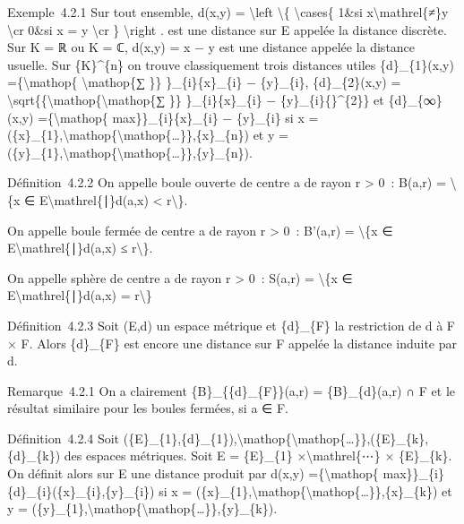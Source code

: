 \documentclass[]{article}
\begin{document}
Exemple~4.2.1 Sur tout ensemble, d(x,y) = \textbackslash{}left
\textbackslash{}\{ \textbackslash{}cases\{ 1\&si
x\textbackslash{}mathrel\{≠\}y \textbackslash{}cr 0\&si x = y
\textbackslash{}cr \} \textbackslash{}right . est une distance sur E
appelée la distance discrète. Sur K = ℝ ou K = ℂ, d(x,y) = \textbar{}x −
y\textbar{} est une distance appelée la distance usuelle. Sur
\{K\}\^{}\{n\} on trouve classiquement trois distances utiles
\{d\}\_\{1\}(x,y) =\{\textbackslash{}mathop\{ \textbackslash{}mathop\{∑
\}\} \}\_\{i\}\textbar{}\{x\}\_\{i\} − \{y\}\_\{i\}\textbar{},
\{d\}\_\{2\}(x,y) =
\textbackslash{}sqrt\{\{\textbackslash{}mathop\{\textbackslash{}mathop\{∑
\}\} \}\_\{i\}\textbar{}\{x\}\_\{i\} −
\{y\}\_\{i\}\{\textbar{}\}\^{}\{2\}\} et \{d\}\_\{∞\}(x,y)
=\{\textbackslash{}mathop\{ max\}\}\_\{i\}\textbar{}\{x\}\_\{i\} −
\{y\}\_\{i\}\textbar{} si x =
(\{x\}\_\{1\},\textbackslash{}mathop\{\textbackslash{}mathop\{\ldots{}\}\},\{x\}\_\{n\})
et y =
(\{y\}\_\{1\},\textbackslash{}mathop\{\textbackslash{}mathop\{\ldots{}\}\},\{y\}\_\{n\}).

Définition~4.2.2 On appelle boule ouverte de centre a de rayon r
\textgreater{} 0~: B(a,r) = \textbackslash{}\{x ∈
E\textbackslash{}mathrel\{∣\}d(a,x) \textless{} r\textbackslash{}\}.

On appelle boule fermée de centre a de rayon r \textgreater{} 0~:
B'(a,r) = \textbackslash{}\{x ∈ E\textbackslash{}mathrel\{∣\}d(a,x) ≤
r\textbackslash{}\}.

On appelle sphère de centre a de rayon r \textgreater{} 0~: S(a,r) =
\textbackslash{}\{x ∈ E\textbackslash{}mathrel\{∣\}d(a,x) =
r\textbackslash{}\}

Définition~4.2.3 Soit (E,d) un espace métrique et \{d\}\_\{F\} la
restriction de d à F × F. Alors \{d\}\_\{F\} est encore une distance sur
F appelée la distance induite par d.

Remarque~4.2.1 On a clairement \{B\}\_\{\{d\}\_\{F\}\}(a,r) =
\{B\}\_\{d\}(a,r) ∩ F et le résultat similaire pour les boules fermées,
si a ∈ F.

Définition~4.2.4 Soit
(\{E\}\_\{1\},\{d\}\_\{1\}),\textbackslash{}mathop\{\textbackslash{}mathop\{\ldots{}\}\},(\{E\}\_\{k\},\{d\}\_\{k\})
des espaces métriques. Soit E = \{E\}\_\{1\}
×\textbackslash{}mathrel\{⋯\} × \{E\}\_\{k\}. On définit alors sur E une
distance produit par d(x,y) =\{\textbackslash{}mathop\{
max\}\}\_\{i\}\{d\}\_\{i\}(\{x\}\_\{i\},\{y\}\_\{i\}) si x =
(\{x\}\_\{1\},\textbackslash{}mathop\{\textbackslash{}mathop\{\ldots{}\}\},\{x\}\_\{k\})
et y =
(\{y\}\_\{1\},\textbackslash{}mathop\{\textbackslash{}mathop\{\ldots{}\}\},\{y\}\_\{k\}).
\end{document}
